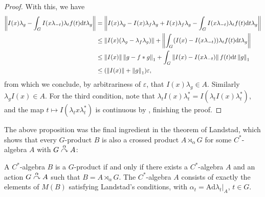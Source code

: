 \begin{proof}
	With this, we have
	\begin{align*}
		\left\lVert I(x) \lambda_g - \int_G I(x \lambda_{-t})\lambda_t f(t) \mathrm{d} t \lambda_g \right\rVert &= \left\lVert I(x) \lambda_g - I(x)\lambda_f \lambda_g + I(x) \lambda_f \lambda_g - \int_G I(x \lambda_{-t})\lambda_t f(t) \mathrm{d} t \lambda_g \right\rVert\\
		&\leq \left\lVert I(x) (\lambda_g - \lambda_f \lambda_g ) \right\rVert + \left\lVert \int_G (I(x) - I(x\lambda_{-t}))\lambda_t f(t) \mathrm{d} t \lambda_g\right\rVert\\
		&\leq \left\lVert I(x)\right\rVert \left\lVert g - f \ast g \right\rVert_1 + \int_G \left\lVert I(x) - I(x\lambda_{-t})\right\rVert f(t) \mathrm{d} t \left\lVert g \right\rVert_1\\
		&\leq (\left\lVert I(x) \right\rVert + \left\lVert g \right\rVert_1) \varepsilon,
	\end{align*}
	from which we conclude, by arbitrariness of $\varepsilon$, that $I(x) \lambda_g \in A$. Similarly $\lambda_g I(x) \in A$. For the third condition, note that $\lambda_t I(x) \lambda_t^* = I(\lambda_t I(x) \lambda_t^*)$, and the map $t \mapsto I(\lambda_t x \lambda_t^*)$ is continuous by , finishing the proof.
\end{proof}
The above proposition was the final ingredient in the theorem of Landstad, which shows that every $G$-product $B$ is also a crossed product $A \rtimes_\alpha G$ for some $C^*$-algebra $A$ with $G \stackrel{\alpha}{\curvearrowright} A$:
\begin{theorem}
	A $C^*$-algebra $B$ is a $G$-product if and only if there exists a $C^*$-algebra $A$ and an action $G \stackrel{\alpha}{\curvearrowright} A$ such that $B = A \rtimes_\alpha G$. The $C^*$-algebra $A$ consists of exactly the elements of $M(B)$ satisfying Landstad's conditions, with $\alpha_t = \mathrm{Ad} {\lambda_t}|_A$, $t \in G$.	
	\label{landstadcross}
\end{theorem}
